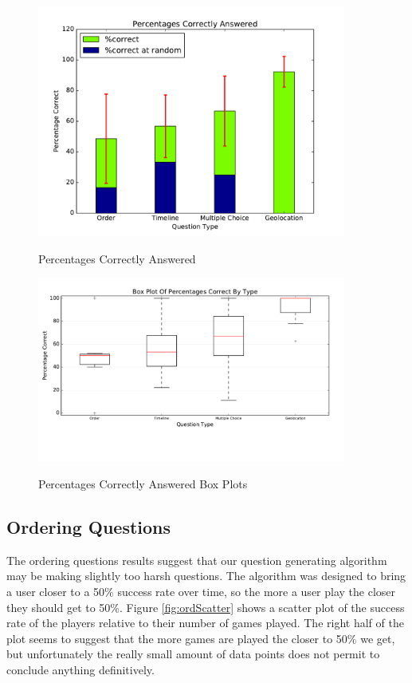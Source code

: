 \begin{figure}
\centering
{\includegraphics[width=4in]{images/pilot_2_correct.pdf}}
\caption{Percentages Correctly Answered}
\label{fig:p2Correct}
\end{figure}
\begin{figure}
\centering
{\includegraphics[width=4in]{images/pilot_2_boxplot.pdf}}
\caption{Percentages Correctly Answered Box Plots}
\label{fig:p2Boxes}
\end{figure}

\subsection{Ordering Questions}
The ordering questions results suggest that our question generating algorithm may be making slightly too harsh questions. The algorithm was designed to bring a user closer to a 50\% success rate over time, so the more a user play the closer they should get to 50\%. Figure \ref{fig:ordScatter} shows a scatter plot of the success rate of the players relative to their number of games played. The right half of the plot seems to suggest that the more games are played the closer to 50\% we get, but unfortunately the really small amount of data points does not permit to conclude anything definitively.

